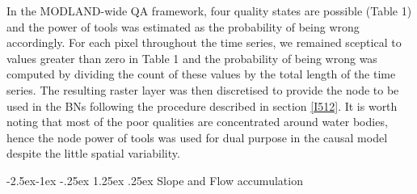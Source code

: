 \documentclass[12pt,oneside]{article}
\makeatletter
\renewcommand\paragraph{\@startsection{paragraph}{4}{\z@}%
            {-2.5ex\@plus -1ex \@minus -.25ex}%
            {1.25ex \@plus .25ex}%
            {\normalfont\normalsize\bfseries}}
\makeatother
\begin{document}
In the MODLAND-wide QA framework, four quality states are possible (Table 1) and the power of tools was estimated as the probability of being wrong accordingly. For each pixel throughout the time series, we remained sceptical to values greater than zero in Table 1 and the probability of being wrong was computed by dividing the count of these values by the total length of the time series. The resulting raster layer was then discretised to provide the node to be used in the BNs following the procedure described in section \ref{I512}. It is worth noting that most of the poor qualities are concentrated around water bodies, hence the node power of tools was used for dual purpose in the causal model despite the little spatial variability.

\hypertarget{I526}{%
\paragraph{Slope and Flow accumulation}\label{I526}}
\end{document}
